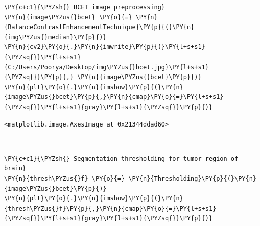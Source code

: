 \begin{tcolorbox}[breakable, size=fbox, boxrule=1pt, pad at break*=1mm,colback=cellbackground, colframe=cellborder]
	\begin{Verbatim}[commandchars=\\\{\}]
\PY{c+c1}{\PYZsh{} BCET image preprocessing}
\PY{n}{image\PYZus{}bcet} \PY{o}{=} \PY{n}{BalanceContrastEnhancementTechnique}\PY{p}{(}\PY{n}{img\PYZus{}median}\PY{p}{)}
\PY{n}{cv2}\PY{o}{.}\PY{n}{imwrite}\PY{p}{(}\PY{l+s+s1}{\PYZsq{}}\PY{l+s+s1}{C:/Users/Poorya/Desktop/img\PYZus{}bcet.jpg}\PY{l+s+s1}{\PYZsq{}}\PY{p}{,} \PY{n}{image\PYZus{}bcet}\PY{p}{)}
\PY{n}{plt}\PY{o}{.}\PY{n}{imshow}\PY{p}{(}\PY{n}{image\PYZus{}bcet}\PY{p}{,}\PY{n}{cmap}\PY{o}{=}\PY{l+s+s1}{\PYZsq{}}\PY{l+s+s1}{gray}\PY{l+s+s1}{\PYZsq{}}\PY{p}{)}
	\end{Verbatim}
\end{tcolorbox}

\begin{tcolorbox}[breakable, size=fbox, boxrule=.5pt, pad at break*=1mm, opacityfill=0]
	\begin{Verbatim}[commandchars=\\\{\}]
<matplotlib.image.AxesImage at 0x21344ddad60>
	\end{Verbatim}
\end{tcolorbox}

\begin{center}
\end{center}
{ \hspace*{\fill} \\}

\begin{tcolorbox}[breakable, size=fbox, boxrule=1pt, pad at break*=1mm,colback=cellbackground, colframe=cellborder]
	\begin{Verbatim}[commandchars=\\\{\}]
\PY{c+c1}{\PYZsh{} Segmentation thresholding for tumor region of brain}
\PY{n}{thresh\PYZus{}f} \PY{o}{=} \PY{n}{Thresholding}\PY{p}{(}\PY{n}{image\PYZus{}bcet}\PY{p}{)}
\PY{n}{plt}\PY{o}{.}\PY{n}{imshow}\PY{p}{(}\PY{n}{thresh\PYZus{}f}\PY{p}{,}\PY{n}{cmap}\PY{o}{=}\PY{l+s+s1}{\PYZsq{}}\PY{l+s+s1}{gray}\PY{l+s+s1}{\PYZsq{}}\PY{p}{)}
	\end{Verbatim}
\end{tcolorbox}

